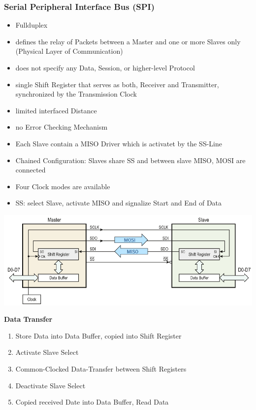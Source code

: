 \subsubsection{Serial Peripheral Interface Bus (SPI)} 
\begin{multicols}{2}
    \begin{itemize}
    	\item Fullduplex
    	\item defines the relay of Packets between a Master and one or more Slaves only (Physical Layer of Communication)
    	\item does not specify any Data, Session, or higher-level Protocol
    	\item single Shift Register that serves as both, Receiver and Transmitter, synchronized by the Transmission Clock
    	\item limited interfaced Distance
    	\item no Error Checking Mechanism
    	\item Each Slave contain a MISO Driver which is activatet by the SS-Line
    	\item Chained Configuration: Slaves share SS and between slave MISO, MOSI are connected
    	\item Four Clock modes are available
    	\item SS: select Slave, activate MISO and signalize Start and End of Data
    \end{itemize}
\end{multicols}
\begin{minipage}{0.6\linewidth}
    \includegraphics[width=\linewidth]{images/spi.png}
\end{minipage}
\begin{minipage}{0.4\linewidth}
     \textbf{Data Transfer}
    \begin{enumerate}
    	\item Store Data into Data Buffer, copied into Shift Register
    	\item Activate Slave Select
    	\item Common-Clocked Data-Transfer between Shift Registers
    	\item Deactivate Slave Select
    	\item Copied received Date into Data Buffer, Read Data
    \end{enumerate}
\end{minipage}
\vspace{-1cm}
